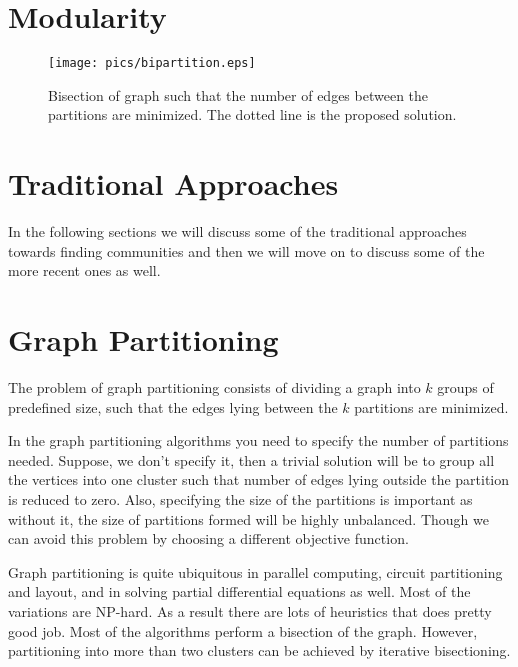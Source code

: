 \documentclass[letterpaper]{article}
\begin{document}
\section{Modularity}







\begin{figure}
\texttt{[image: pics/bipartition.eps]}
\caption{Bisection of graph such that the number of edges between the partitions are minimized. The dotted line
is the proposed solution.}
\label{fig:bipart}
\end{figure}
\section{Traditional Approaches} In the following sections we will discuss some
of the traditional approaches towards finding communities and then we will move
on to discuss some of the more recent ones as well.  

\section{Graph
Partitioning} The problem of graph partitioning consists of dividing a graph
into $k$ groups of predefined size, such that the edges lying between the $k$
partitions are minimized. 

In the graph partitioning algorithms you need to specify the number of
partitions needed. Suppose, we don't specify it, then a trivial solution will
be to group all the vertices into one cluster such that number of edges lying
outside the partition is reduced to zero.  Also, specifying the size of the
partitions is important as without it, the size of partitions formed will be
highly unbalanced. Though we can avoid this problem by choosing a different
objective function.

Graph partitioning is quite ubiquitous in parallel computing, circuit
partitioning and layout, and in solving partial differential equations as well.
Most of the variations are NP-hard. As a result there are lots of heuristics
that does pretty good job. Most of the algorithms perform a bisection of the
graph. However, partitioning into more than two clusters can be achieved by
iterative bisectioning. 
\end{document}
